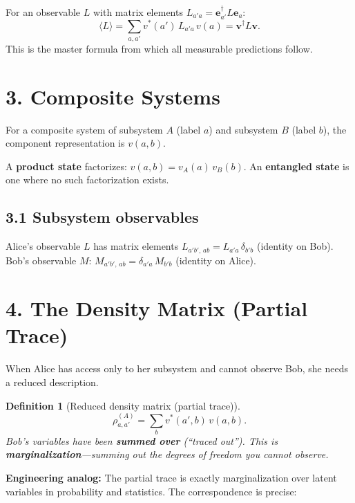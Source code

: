 \documentclass[12pt,a4paper]{article}
\newtheorem{definition}{Definition}
\begin{document}
For an observable $L$ with matrix elements $L_{a'a}=\mathbf{e}_{a'}^\dagger L\mathbf{e}_a$:
\[
    \langle L \rangle = \sum_{a,a'} v^*(a')\,L_{a'a}\,v(a) = \mathbf{v}^\dagger L\mathbf{v}.
\]
This is the master formula from which all measurable predictions follow.

\section{3. Composite Systems}

For a composite system of subsystem $A$ (label $a$) and subsystem $B$ (label $b$), the component representation is $v(a,b)$.

A \textbf{product state} factorizes: $v(a,b) = v_A(a)\,v_B(b)$.  An \textbf{entangled state} is one where no such factorization exists.

\subsection{3.1 Subsystem observables}
Alice's observable $L$ has matrix elements $L_{a'b',\,ab} = L_{a'a}\,\delta_{b'b}$ (identity on Bob).  Bob's observable $M$: $M_{a'b',\,ab} = \delta_{a'a}\,M_{b'b}$ (identity on Alice).

\section{4. The Density Matrix (Partial Trace)}

When Alice has access only to her subsystem and cannot observe Bob, she needs a reduced description.

\begin{definition}[Reduced density matrix (partial trace)]
\[
    \boxed{\rho^{(A)}_{a,a'} = \sum_b v^*(a',b)\,v(a,b).}
\]
Bob's variables have been \textbf{summed over} (``traced out'').  This is \textbf{marginalization}---summing out the degrees of freedom you cannot observe.
\end{definition}

\medskip
\noindent\textbf{Engineering analog:} The partial trace is exactly marginalization over latent variables in probability and statistics.  The correspondence is precise:
\end{document}
